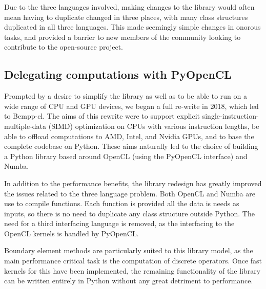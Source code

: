 Due to the three languages involved, making changes to the library would often mean having to duplicate changed in three places, with many class structures duplicated in all three languages. This made seemingly simple changes in onorous tasks, and provided a barrier to new members of the community looking to contribute to the open-source project.

\subsection{Delegating computations with PyOpenCL}
Prompted by a desire to simplify the library as well as to be able to run on a wide range of CPU and GPU devices, we began a full re-write in 2018, which led to Bempp-cl. The aims of this rewrite were to support explicit single-instruction-multiple-data (SIMD) optimization on CPUs with various instruction lengths, be able to offload computations to AMD, Intel, and Nvidia GPUs, and to base the complete codebase on Python. These aims naturally led to the choice of building a Python library based around OpenCL (using the PyOpenCL interface) and Numba.

In addition to the performance benefits, the library redesign has greatly improved the issues related to the three language problem. Both OpenCL and Numba are use to compile functions. Each function is provided all the data is needs as inputs, so there is no need to duplicate any class structure outside Python. The need for a third interfacing language is removed, as the interfacing to the OpenCL kernels is handled by PyOpenCL.

Boundary element methods are particularly suited to this library model, as the main performance critical task is the computation of discrete operators. Once fast kernels for this have been implemented, the remaining functionality of the library can be written entirely in Python without any great detriment to performance.
